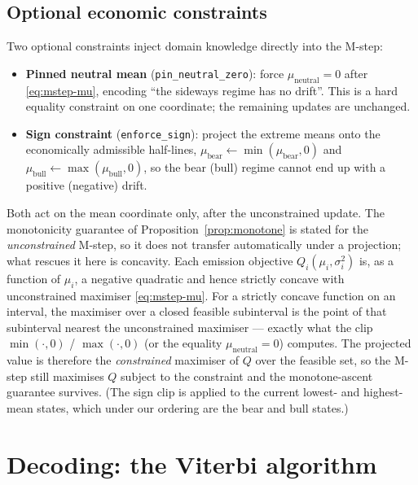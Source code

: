 \documentclass[11pt]{article}
\theoremstyle{plain}
\theoremstyle{definition}
\theoremstyle{remark}
\begin{document}
\subsection{Optional economic constraints}
Two optional constraints inject domain knowledge directly into the M-step:
\begin{itemize}[leftmargin=1.6em]
  \item \textbf{Pinned neutral mean} (\texttt{pin\_neutral\_zero}): force
        $\mu_{\text{neutral}}=0$ after \eqref{eq:mstep-mu}, encoding ``the
        sideways regime has no drift''. This is a hard equality constraint on
        one coordinate; the remaining updates are unchanged.
  \item \textbf{Sign constraint} (\texttt{enforce\_sign}): project the extreme
        means onto the economically admissible half-lines,
        $\mu_{\text{bear}}\leftarrow\min(\mu_{\text{bear}},0)$ and
        $\mu_{\text{bull}}\leftarrow\max(\mu_{\text{bull}},0)$, so the bear
        (bull) regime cannot end up with a positive (negative) drift.
\end{itemize}
Both act on the mean coordinate only, after the unconstrained update. The
monotonicity guarantee of Proposition~\ref{prop:monotone} is stated for the
\emph{unconstrained} M-step, so it does not transfer automatically under a
projection; what rescues it here is concavity. Each emission objective
$Q_i(\mu_i,\sigma_i^2)$ is, as a function of $\mu_i$, a negative quadratic and
hence strictly concave with unconstrained maximiser \eqref{eq:mstep-mu}. For a
strictly concave function on an interval, the maximiser over a closed feasible
subinterval is the point of that subinterval nearest the unconstrained
maximiser --- exactly what the clip $\min(\cdot,0)$ / $\max(\cdot,0)$ (or the
equality $\mu_{\text{neutral}}=0$) computes. The projected value is therefore the
\emph{constrained} maximiser of $Q$ over the feasible set, so the M-step still
maximises $Q$ subject to the constraint and the monotone-ascent guarantee
survives. (The sign clip is applied to the current lowest- and highest-mean
states, which under our ordering are the bear and bull states.)

\section{Decoding: the Viterbi algorithm}\label{sec:viterbi}
\end{document}
